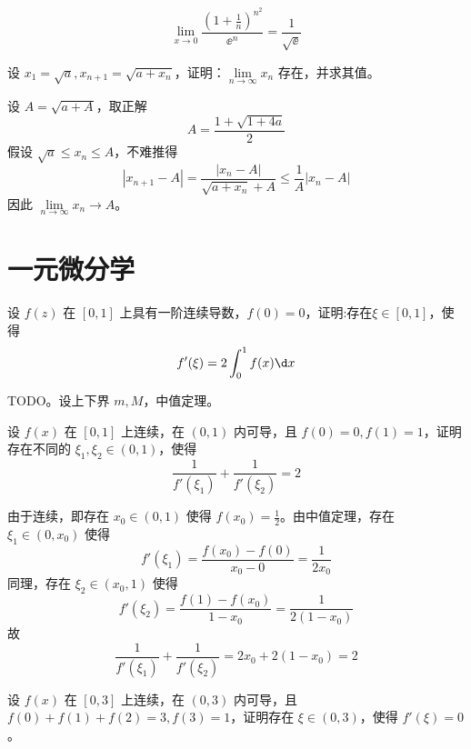 \begin{solution}
	\[ \lim_{x \to 0} \frac{\left(1+\frac{1}{n}\right)^{n^2}}{\ee^n} = \frac{1}{\sqrt{\ee}} \]
\end{solution}

\begin{problem}[000067]
设 $x_1 = \sqrt{a}, x_{n+1} = \sqrt{a + x_n}$，证明：$\lim\limits_{n\to \infty} x_n$ 存在，并求其值。
\end{problem}

\begin{solution}
	设 $A = \sqrt{a + A}$，取正解
	\[ A = \frac{1 + \sqrt{1+4a}}{2} \]
	假设 $\sqrt{a} \leqslant x_n \leqslant A$，不难推得
	\[ |x_{n+1} - A| = \frac{|x_n - A|}{\sqrt{a+x_n} + A} \leqslant \frac{1}{A} |x_n - A| \]
	因此 $\lim\limits_{n \to \infty} x_n \to A$。
\end{solution}

\section{一元微分学}

\begin{problem}[000009]
设 $f(z)$ 在 $[0,1]$ 上具有一阶连续导数，$f(0) = 0$，证明:存在$\xi \in [0,1]$，使得
\[ f'(\xi) = 2\int_0^1f(x) \d x \]
\end{problem}

\begin{solution}
	TODO。设上下界 $m, M$，中值定理。
\end{solution}

\begin{problem}[000010]
设 $f(x)$ 在 $[0, 1]$ 上连续，在 $(0, 1)$ 内可导，且 $f(0) = 0, f(1) = 1$，证明存在不同的 $\xi_1, \xi_2 \in (0, 1)$，使得
\[ \frac{1}{f'(\xi_1)} + \frac{1}{f'(\xi_2)} = 2 \]
\end{problem}

\begin{solution}
	由于连续，即存在 $x_0 \in (0, 1)$ 使得 $f(x_0) = \frac{1}{2}$。由中值定理，存在 $\xi_1 \in (0, x_0)$ 使得
	\[ f'(\xi_1) = \frac{f(x_0) - f(0)}{x_0 - 0} = \frac{1}{2x_0}
	\]
	同理，存在 $\xi_2 \in (x_0, 1)$ 使得
	\[ f'(\xi_2) = \frac{f(1) - f(x_0)}{1 - x_0} = \frac{1}{2(1 -x_0)} \]
	故
	\[ \frac{1}{f'(\xi_1)} + \frac{1}{f'(\xi_2)} = 2x_0 + 2(1 - x_0) = 2 \]

\end{solution}

\begin{problem}[000011]
设 $f(x)$ 在 $[0, 3]$ 上连续，在 $(0, 3)$ 内可导，且 $f(0) + f(1) + f(2) = 3, f(3) = 1$，证明存在 $\xi \in (0, 3)$，使得 $f'(\xi) = 0$。
\end{problem}

